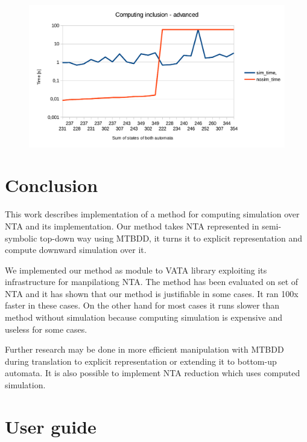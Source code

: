 \documentclass[a4paper, 12pt]{article}
\begin{document}
\begin{figure}[h]
	\centering
	\includegraphics{g_advanced}
	\caption{}
	\label{fig:g_advanced}
\end{figure}

\section{Conclusion}
\label{sec:end}

This work describes implementation of a method for computing simulation over NTA and its implementation.
Our method takes NTA represented in semi-symbolic top-down way using MTBDD, it
turns it to explicit representation and compute downward simulation over it.

We implemented our method as module to VATA library exploiting its infrastructure for manpilationg NTA.
The method has been evaluated on set of NTA and it has shown that our method is justifiable in some cases. It ran 100x faster in these cases. On the other hand for most cases it runs slower than method without simulation because computing simulation is expensive and useless for some cases.


Further research may be done in more efficient manipulation with MTBDD during translation to explicit representation or
extending it to bottom-up automata.
It is also possible to implement NTA reduction which uses computed simulation.

\newpage
\appendix
\section{User guide}
\label{app:usage}
\end{document}
